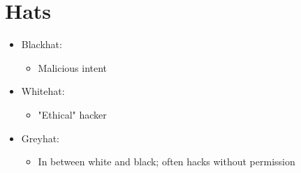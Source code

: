 \section{Hats}

\begin{flushleft}
\begin{itemize}
	\item[] Blackhat:
		\begin{itemize}
			\item Malicious intent
		\end{itemize}
	\item[] Whitehat:
		\begin{itemize}
			\item "Ethical" hacker
		\end{itemize}
	\item[] Greyhat:
		\begin{itemize}
			\item In between white and black; often hacks without permission
		\end{itemize}
\end{itemize}
\end{flushleft}
